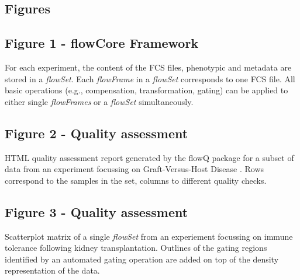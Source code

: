 \documentclass[10pt]{bmc_article}
\newcommand{\Rclass}[1]{{\textit{#1}}}
\newenvironment{bmcformat}{\begin{raggedright}\baselineskip20pt\sloppy\setboolean{publ}{false}}{\end{raggedright}\baselineskip20pt\sloppy}
\begin{document}
\begin{bmcformat}




\section*{Figures}
  \subsection*{Figure 1 - flowCore Framework}
 \label{fig1:FrameWork}For each experiment, the content of
        the FCS files, phenotypic and metadata are stored in a
        \Rclass{flowSet}. Each \Rclass{flowFrame} in a \Rclass{flowSet}
        corresponds to one FCS file. All basic operations (e.g.,
        compensation, transformation, gating) can be applied to either
        single \Rclass{flowFrames} or a \Rclass{flowSet} simultaneously.

  
  \subsection*{Figure 2 - Quality assessment}
    \label{flowQ}%
        HTML quality assessment report generated by the flowQ package for a
        subset of data from an experiment focussing on Graft-Versus-Host
        Disease \cite{brinkman2007hcf}. Rows correspond to the samples in
        the set, columns to different quality checks.


    \subsection*{Figure 3 - Quality assessment}
    \label{xyplot}{
        Scatterplot matrix of a single \Rclass{flowSet} from an experiement
        focussing on immune tolerance following kidney
        transplantation. Outlines of the gating regions identified by an
        automated gating operation are added on top of the density
        representation of the data.}


\end{bmcformat}
\end{document}
